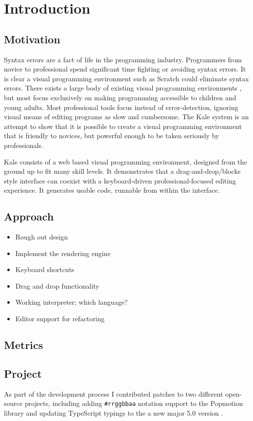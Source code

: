 \chapter{Introduction}

\section{Motivation}
Syntax errors are a fact of life in the programming industry. Programmers from
novice \citep{Denny2011} to professional spend significant time fighting or
avoiding syntax errors. It is clear a visual programming environment such
as Scratch could eliminate syntax errors. There exists a large body of existing
visual programming environments \citep{Beldie1983}, but most focus exclusively
on making programming accessible to children and young adults. Most
professional tools focus instead of error-detection, ignoring visual means of
editing programs as slow and cumbersome. The Kale system is an attempt to show that it is possible to create a
visual programming environment that is friendly to novices, but powerful enough to be
taken seriously by professionals. 

Kale consists of a web based visual programming environment, designed
from the ground up to fit many skill levels. It demonstrates that a
drag-and-drop/blocks style interface can coexist with a keyboard-driven
professional-focused editing experience. It generates usable code,
runnable from within the interface.

\section{Approach}

\begin{itemize}
	\item Rough out design
	\item Implement the rendering engine
	\item Keyboard shortcuts
	\item Drag and drop functionality
	\item Working interpreter; which language?
	\item Editor support for refactoring
\end{itemize}

\section{Metrics}
\section{Project}

As part of the development process I contributed patches to two different
open-source projects, including adding \texttt{\#rrggbbaa} notation support
to the Popmotion library \citep{github-pr-popmotion} and updating
 TypeScript typings to the a new major 5.0
version \citep{github-pr-styled-components}.

